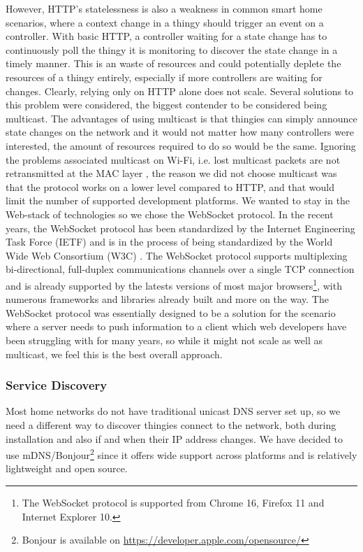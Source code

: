 \documentclass{ubicomp2012}
\begin{document}
However, HTTP's statelessness is also a weakness in common smart home scenarios, where a context change in a thingy should trigger an event on a controller. With basic HTTP, a controller waiting for a state change has to continuously poll the thingy it is monitoring to discover the state change in a timely manner. This is an waste of resources and could potentially deplete the resources of a thingy entirely, especially if more controllers are waiting for changes. Clearly, relying only on HTTP alone does not scale. Several solutions to this problem were considered, the biggest contender to be considered being multicast. The advantages of using multicast is that thingies can simply announce state changes on the network and it would not matter how many controllers were interested, the amount of resources required to do so would be the same. Ignoring the problems associated multicast on Wi-Fi, i.e. lost multicast packets are not retransmitted at the MAC layer \cite{conf/icnp/ChandraKMNPRR09}, the reason we did not choose multicast was that the protocol works on a lower level compared to HTTP, and that would limit the number of supported development platforms. We wanted to stay in the Web-stack of technologies so we chose the WebSocket protocol. In the recent years, the WebSocket protocol has been standardized by the Internet Engineering Task Force (IETF) \cite{IETFWebsockets} and is in the process of being standardized by the World Wide Web Consortium (W3C) \cite{w3cWebsockets}. The WebSocket protocol supports multiplexing bi-directional, full-duplex communications channels over a single TCP connection and is already supported by the latests versions of most major browsers\footnote{The WebSocket protocol is supported from Chrome 16, Firefox 11 and Internet Explorer 10.}, with numerous frameworks and libraries already built and more on the way. The WebSocket protocol was essentially designed to be a solution for the scenario where a server needs to push information to a client\cite{IETFWebsockets} which web developers have been struggling with for many years, so while it might not scale as well as multicast, we feel this is the best overall approach.

\subsubsection{Service Discovery}
Most home networks do not have traditional unicast DNS server set up, so we need a different way to discover thingies connect to the network, both during installation and also if and when their IP address changes. We have decided to use mDNS/Bonjour\footnote{Bonjour is available on \url{https://developer.apple.com/opensource/}} since it offers wide support across platforms and is relatively lightweight and open source.
\end{document}
